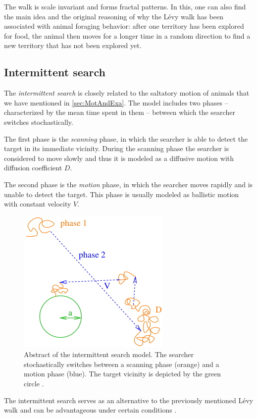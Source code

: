 The walk is scale invariant and forms fractal patterns. In this, one can also find the main idea and the original reasoning of why the Lévy walk has been associated with animal foraging behavior: after one territory has been explored for food, the animal then moves for a longer time in a random direction to find a new territory that has not been explored yet.

\subsection{Intermittent search}
The \textit{intermittent search} is closely related to the saltatory motion of animals that we have mentioned in \autoref{sec:MotAndExa}. The model includes two phases -- characterized by the mean time spent in them -- between which the searcher switches stochastically.

The first phase is the \textit{scanning} phase, in which the searcher is able to detect the target in its immediate vicinity. During the scanning phase the searcher is considered to move slowly and thus it is modeled as a diffusive motion with diffusion coefficient $D$.

The second phase is the \textit{motion} phase, in which the searcher moves rapidly and is unable to detect the target. This phase is usually modeled as ballistic motion with constant velocity $V$.

\begin{figure}[bth]
 \myfloatalign
 \includegraphics[width=0.4\linewidth]{gfx/intermittent-search}
 \caption[Abstract intermittent search]{Abstract of the intermittent search model. The searcher stochastically switches between a scanning phase (orange) and a motion phase (blue). The target vicinity is depicted by the green circle \cite{benichou:2011}.}\label{fig:intermittent-search}
\end{figure}

The intermittent search serves as an alternative to the previously mentioned Lévy walk and can be advantageous under certain conditions \cite{benichou:2011}.

